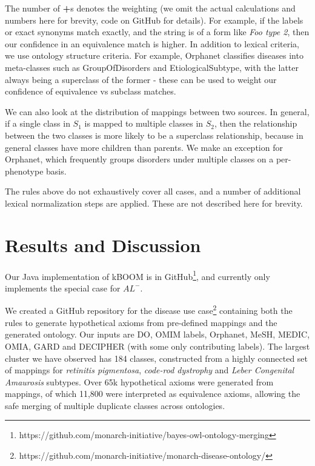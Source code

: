 \documentclass{my}
\begin{document}
The number of \textbf{+}s denotes the weighting (we omit the actual
calculations and numbers here for brevity, code on GitHub for
details). For example, if the labels or exact synonyms match exactly,
and the string is of a form like \emph{Foo type 2}, then our confidence
in an equivalence match is higher. In addition to lexical criteria, we
use ontology structure criteria. For example, Orphanet classifies
diseases into meta-classes such as GroupOfDisorders and
EtiologicalSubtype, with the latter always being a superclass of the
former - these can be used to weight our confidence of equivalence vs
subclass matches.

We can also look at the distribution of mappings between two
sources. In general, if a single class in $S_1$ is mapped to multiple
classes in $S_2$, then the relationship between the two classes is
more likely to be a superclass relationship, because in general
classes have more children than parents. We make an exception for
Orphanet, which frequently groups disorders under multiple classes on
a per-phenotype basis.

The rules above do not exhaustively cover all cases, and a number of
additional lexical normalization steps are applied. These are not
described here for brevity.

\section{Results and Discussion}

Our Java implementation of kBOOM is in
GitHub\footnote{https://github.com/monarch-initiative/bayes-owl-ontology-merging},
and currently only implements the special case for $AL^{-}$.

We created a GitHub repository for the disease use
case\footnote{https://github.com/monarch-initiative/monarch-disease-ontology/}
containing both the rules to generate hypothetical axioms from
pre-defined mappings and the generated ontology. Our inputs are DO,
OMIM labels, Orphanet, MeSH, MEDIC, OMIA, GARD and DECIPHER (with some only contributing labels). The largest cluster we
have observed has 184 classes, constructed from a highly connected set
of mappings for \emph{retinitis pigmentosa}, \emph{code-rod dystrophy} and \emph{Leber
Congenital Amaurosis} subtypes. Over 65k hypothetical axioms were
generated from mappings, of which 11,800 were interpreted as
equivalence axioms, allowing the safe merging of multiple duplicate
classes across ontologies.
\end{document}
